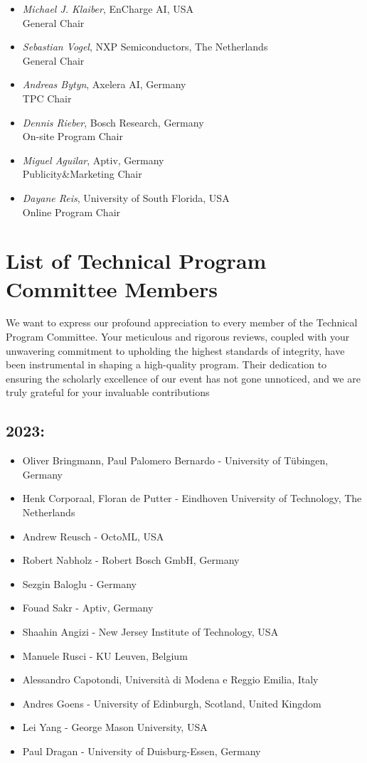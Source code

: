 \documentclass[sigconf]{acmart}
\begin{document}
\begin{itemize}
	\item \textit{Michael J. Klaiber}, EnCharge AI, USA\\ General Chair
	\item \textit{Sebastian Vogel}, NXP Semiconductors, The Netherlands\\ General Chair
		\item \textit{Andreas Bytyn}, Axelera AI, Germany\\ TPC Chair
			\item \textit{Dennis Rieber}, Bosch Research, Germany\\ On-site Program Chair

	\item \textit{Miguel Aguilar}, Aptiv, Germany\\ Publicity\&Marketing Chair
		\item \textit{Dayane Reis}, University of South Florida, USA\\ Online Program Chair
\end{itemize}


\section{List of Technical Program Committee Members}

We want to express our profound appreciation to every member of the Technical Program Committee. Your meticulous and rigorous reviews, coupled with your unwavering commitment to upholding the highest standards of integrity, have been instrumental in shaping a high-quality program. Their  dedication to ensuring the scholarly excellence of our event has not gone unnoticed, and we are truly grateful for your invaluable contributions

\subsection*{2023:}
\begin{itemize}
	\item Oliver Bringmann, Paul Palomero Bernardo - University of Tübingen, Germany
	\item Henk Corporaal, Floran de Putter - Eindhoven University of Technology, The Netherlands
	\item Andrew Reusch - OctoML, USA
	\item Robert Nabholz - Robert Bosch GmbH, Germany
	\item Sezgin Baloglu - Germany
	\item Fouad Sakr - Aptiv, Germany
	\item Shaahin Angizi - New Jersey Institute of Technology, USA
	\item Manuele Rusci - KU Leuven, Belgium
	\item Alessandro Capotondi, Università di Modena e Reggio Emilia, Italy
	\item Andres Goens - University of Edinburgh, Scotland, United Kingdom
	\item Lei Yang - George Mason University, USA
	\item Paul Dragan - University of Duisburg-Essen, Germany
\end{itemize}
\end{document}
